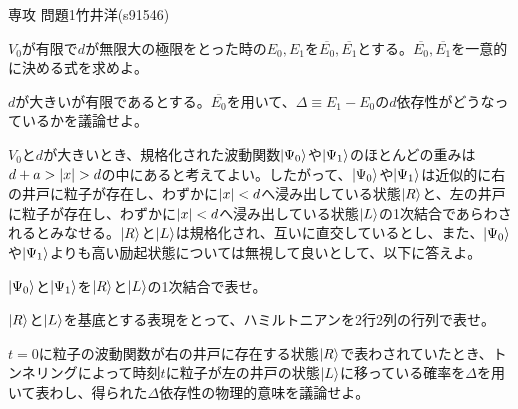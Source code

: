 \documentclass[fleqn]{jbook}
\begin{document}
\begin{question}{専攻 問題1}{竹井洋(s91546)}
\begin{subquestions}
\SubQuestion

$V_0$が有限で$d$が無限大の極限をとった時の$E_0,E_1$を$\overline{E_0},\overline{E_1}$とする。$\overline{E_0},\overline{E_1}$を一意的に決める式を求めよ。

\SubQuestion

$d$が大きいが有限であるとする。$\overline{E_0}$を用いて、$\Delta\equiv E_1-E_0$の$d$依存性がどうなっているかを議論せよ。
\end{subquestions}

$V_0$と$d$が大きいとき、規格化された波動関数$\Ket{\Psi_0}$や$\Ket{\Psi_1}$のほとんどの重みは$d+a>\Norm{x}>d$の中にあると考えてよい。したがって、$\Ket{\Psi_0}$や$\Ket{\Psi_1}$は近似的に右の井戸に粒子が存在し、わずかに$\Norm{x}<d$へ浸み出している状態$\Ket{R}$と、左の井戸に粒子が存在し、わずかに$\Norm{x}<d$へ浸み出している状態$\Ket{L}$の1次結合であらわされるとみなせる。$\Ket{R}$と$\Ket{L}$は規格化され、互いに直交しているとし、また、$\Ket{\Psi_0}$や$\Ket{\Psi_1}$よりも高い励起状態については無視して良いとして、以下に答えよ。

\begin{subquestions}[5]

\SubQuestion

$\Ket{\Psi_0}$と$\Ket{\Psi_1}$を$\Ket{R}$と$\Ket{L}$の1次結合で表せ。

\SubQuestion

$\Ket{R}$と$\Ket{L}$を基底とする表現をとって、ハミルトニアンを2行2列の行列で表せ。

\SubQuestion

$t=0$に粒子の波動関数が右の井戸に存在する状態$\Ket{R}$で表わされていたとき、トンネリングによって時刻$t$に粒子が左の井戸の状態$\Ket{L}$に移っている確率を$\Delta$を用いて表わし、得られた$\Delta$依存性の物理的意味を議論せよ。

\end{subquestions}
\end{question}
\end{document}
